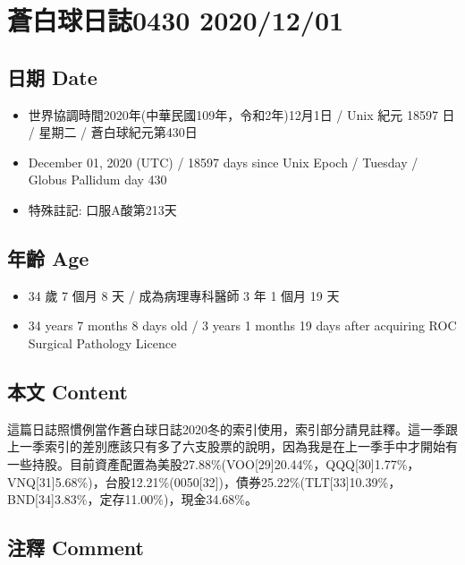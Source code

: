 \documentclass[
]{article}
\author{}
\date{}
\providecommand{\tightlist}{%
  \setlength{\itemsep}{0pt}\setlength{\parskip}{0pt}}
\begin{document}
\hypertarget{ux84bcux767dux7403ux65e5ux8a8c0430-20201201}{%
\section{蒼白球日誌0430
2020/12/01}\label{ux84bcux767dux7403ux65e5ux8a8c0430-20201201}}

\hypertarget{ux65e5ux671f-date}{%
\subsection{日期 Date}\label{ux65e5ux671f-date}}

\begin{itemize}
\tightlist
\item
  世界協調時間2020年(中華民國109年，令和2年)12月1日 / Unix 紀元 18597 日
  / 星期二 / 蒼白球紀元第430日
\item
  December 01, 2020 (UTC) / 18597 days since Unix Epoch / Tuesday /
  Globus Pallidum day 430
\item
  特殊註記: 口服A酸第213天
\end{itemize}

\hypertarget{ux5e74ux9f61-age}{%
\subsection{年齡 Age}\label{ux5e74ux9f61-age}}

\begin{itemize}
\tightlist
\item
  34 歲 7 個月 8 天 / 成為病理專科醫師 3 年 1 個月 19 天
\item
  34 years 7 months 8 days old / 3 years 1 months 19 days after
  acquiring ROC Surgical Pathology Licence
\end{itemize}

\hypertarget{ux672cux6587-content}{%
\subsection{本文 Content}\label{ux672cux6587-content}}

這篇日誌照慣例當作蒼白球日誌2020冬的索引使用，索引部分請見註釋。這一季跟上一季索引的差別應該只有多了六支股票的說明，因為我是在上一季手中才開始有一些持股。目前資產配置為美股27.88\%(VOO{[}29{]}20.44\%，QQQ{[}30{]}1.77\%，VNQ{[}31{]}5.68\%)，台股12.21\%(0050{[}32{]})，債券25.22\%(TLT{[}33{]}10.39\%，BND{[}34{]}3.83\%，定存11.00\%)，現金34.68\%。

\hypertarget{ux6ce8ux91cb-comment}{%
\subsection{注釋 Comment}\label{ux6ce8ux91cb-comment}}
\end{document}

